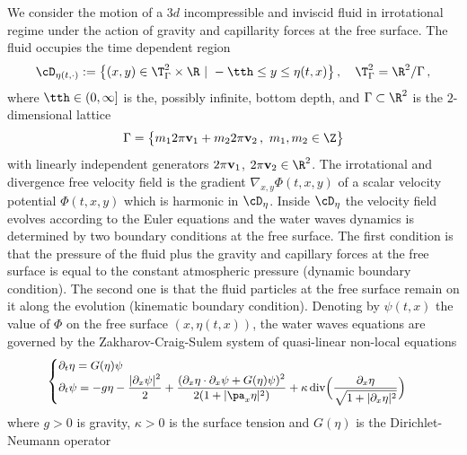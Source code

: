 \documentclass[11pt,a4paper,reqno]{article}
\numberwithin{equation}{section}
\theoremstyle{definition}
\begin{document}
We consider the motion of a $ 3d$ incompressible  and inviscid fluid in irrotational regime under the action of  gravity  and capillarity forces
    at the free surface. The fluid occupies  the time dependent region
    \begin{equation}\label{Domain}
        \cD_{\eta(t, \cdot) }:= \big\{ (x,y)\in \T^2_\Gamma \times \R 
        \ | \ -\tth\leq y\leq \eta(t,x) \big\} \, , \quad 
        \T^2_\Gamma = \R^2/\Gamma \, ,   
    \end{equation}
where $ \tth\in(0,\infty]$ is the, possibly infinite, bottom depth, and $\Gamma\subset \R^2 $ is the $2$-dimensional lattice
\begin{equation}\label{eq:lattice}
\Gamma = %
\big\{ m_1 2 \pi {\bf v}_1 +  
m_2 2 \pi {\bf v}_2 
\, , \ m_1, m_2 \in 
\Z \big\}
\end{equation}
with linearly independent generators
$ 2 \pi {\bf v}_1 $, 
$ 2 \pi {\bf v}_2  \in \R^2  $. 
 The 
irrotational and divergence free velocity field is the gradient $ \nabla_{x,y} \Phi (t,x,y)  $ of a scalar velocity potential $ \Phi (t,x,y)  $ which is  harmonic  in $ \cD_{\eta} $. 
    Inside $ \cD_{\eta}$ the velocity field  evolves according to
the Euler equations and the water waves 
dynamics is  
determined by 
two boundary conditions at the free surface.
The first condition is that   the pressure of the fluid 
plus the gravity and capillary forces at the free surface  is equal to the constant 
atmospheric pressure (dynamic boundary condition). 
The second one  is 
that the fluid particles at the free surface remain on it along the evolution
(kinematic boundary condition).   
 Denoting by $\psi(t,x) $ the value of $\Phi  $ on the free  surface $(x,\eta(t,x))$, the water waves equations are governed by 
 the Zakharov-Craig-Sulem system  \cite{Z,CS} of quasi-linear non-local equations 
 \begin{equation}\label{Zakharov formulation}\small
        \begin{cases}
            \partial_t \eta  = G(\eta)\psi\\
            \displaystyle{\partial_t \psi = - g\eta  - \frac{|\partial_x \psi|^2}{2} + 
            \frac{(  \partial_x \eta \cdot \partial_x \psi + G(\eta)\psi)^2}{2(1+|\pa_x \eta|^2)}  + \kappa\, \text{div} \Big(\frac{\partial_x \eta}{\sqrt{1+|\partial_x \eta|^2}}\Big)} 
        \end{cases}
    \end{equation}
    where 
    $g > 0 $ is gravity, $ \kappa> 0 $ is the surface tension and   $G(\eta)$ is the  Dirichlet-Neumann operator
\end{document}
